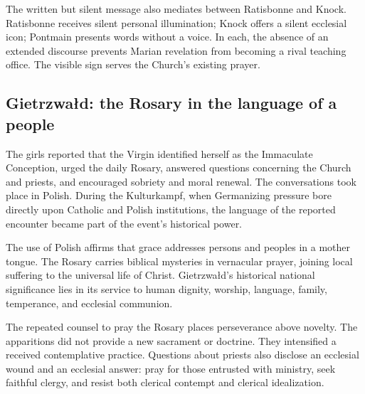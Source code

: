 The written but silent message also mediates between Ratisbonne and Knock. Ratisbonne receives silent personal illumination; Knock offers a silent ecclesial icon; Pontmain presents words without a voice. In each, the absence of an extended discourse prevents Marian revelation from becoming a rival teaching office. The visible sign serves the Church's existing prayer.

\subsection{Gietrzwałd: the Rosary in the language of a people}


The girls reported that the Virgin identified herself as the Immaculate Conception, urged the daily Rosary, answered questions concerning the Church and priests, and encouraged sobriety and moral renewal. The conversations took place in Polish. During the Kulturkampf, when Germanizing pressure bore directly upon Catholic and Polish institutions, the language of the reported encounter became part of the event's historical power.

\enlargethispage{\baselineskip}
The use of Polish affirms that grace addresses persons and peoples in a mother tongue. The Rosary carries biblical mysteries in vernacular prayer, joining local suffering to the universal life of Christ. Gietrzwałd's historical national significance lies in its service to human dignity, worship, language, family, temperance, and ecclesial communion.

The repeated counsel to pray the Rosary places perseverance above novelty. The apparitions did not provide a new sacrament or doctrine. They intensified a received contemplative practice. Questions about priests also disclose an ecclesial wound and an ecclesial answer: pray for those entrusted with ministry, seek faithful clergy, and resist both clerical contempt and clerical idealization.

